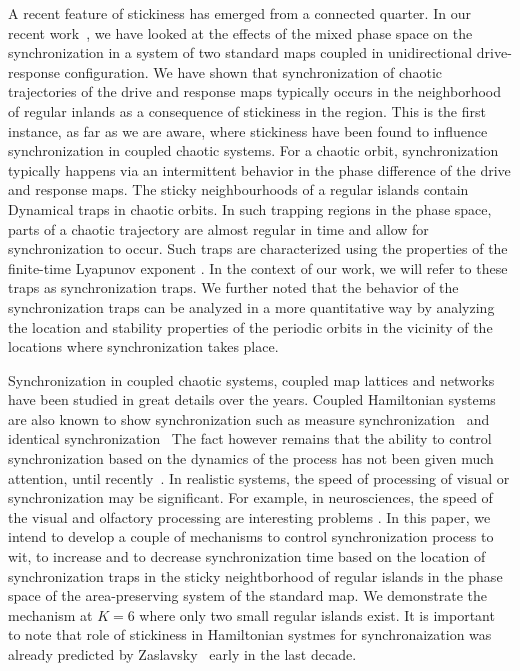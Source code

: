\documentclass[reprint,superscriptaddress,amsmath,amssymb,aps,pre]{revtex4-1}
\begin{document}
A recent feature of stickiness has emerged from a connected quarter. In our recent work~\cite{Mahata2016}, we have looked at the effects of the mixed phase space on the synchronization in a system of two standard maps coupled in unidirectional drive-response configuration. We have shown that synchronization of chaotic trajectories of the drive and response maps typically occurs in the neighborhood of regular inlands as a consequence of stickiness in the region.  This is the first instance, as far as we are aware, where stickiness have been found to influence synchronization in coupled chaotic systems.  For a chaotic orbit, synchronization typically happens via an intermittent behavior in the phase difference of the drive and response maps.   The sticky neighbourhoods of a regular islands contain Dynamical traps in chaotic orbits. In such trapping regions in the phase space, parts of a chaotic trajectory are almost regular in time and allow for synchronization to occur. Such traps are characterized using the properties of the finite-time Lyapunov exponent \cite{Szezech2005}. In the context of our work, we will refer to these traps as synchronization traps. We further noted that the behavior of the synchronization traps can be analyzed in a more quantitative way by analyzing the location and stability properties of the periodic orbits in the vicinity of the locations where synchronization takes place. 

Synchronization in coupled chaotic systems, coupled map lattices and networks 
have been studied in great details over the years. Coupled Hamiltonian systems are also known to show synchronization such as measure synchronization~\cite{Hampton1999,Wang2003,Vincent2005,Gupta2017} and identical synchronization~\cite{Mahata2016,Das2017} The fact however remains 
that the ability to control synchronization based on the dynamics of the 
process has not been given much attention, until 
recently~\cite{Grabow2011,Wang2016}. In realistic systems, the speed of 
processing of visual or  synchronization may be significant. For example, in 
neurosciences,  the speed of the visual and olfactory processing are 
interesting problems \cite{Thorpe1996,Uchida2003}. In this paper, we intend 
to develop a couple of 
mechanisms to control synchronization process to wit,  to increase and to 
decrease synchronization time based on the location of synchronization traps 
in the sticky neightborhood of regular islands in the phase space of the 
area-preserving system of the standard map. We demonstrate the mechanism at $K 
= 6$ where only two small regular islands exist. It is important to note that role of stickiness in Hamiltonian systmes for synchronaization was already predicted by Zaslavsky~\cite{Zaslavsky2002b} early in the last decade.\\
\end{document}
